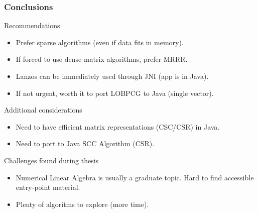  \begin{frame}
  \frametitle{Conclusions}
  \begin{block}{Recommendations}
    \begin{itemize}
    \item Prefer sparse algorithms (even if data fits in memory).
    \item If forced to use dense-matrix algorithms, prefer MRRR.
    \item Lanzos can be immediately used through JNI (app is in Java).
    \item If not urgent, worth it to port LOBPCG to Java (single vector).
    \end{itemize}
  \end{block}
  \begin{block}{Additional considerations}
    \begin{itemize}
    \item Need to have efficient matrix representations (CSC/CSR) in Java.
    \item Need to port to Java SCC Algorithm (CSR).
    \end{itemize}
  \end{block}
  \begin{block}{Challenges found during thesis}
    \begin{itemize}
    \item Numerical Linear Algebra is usually a graduate topic. Hard to find accessible entry-point material.
    \item Plenty of algoritms to explore (more time).
    \end{itemize}
  \end{block}  
\end{frame}
